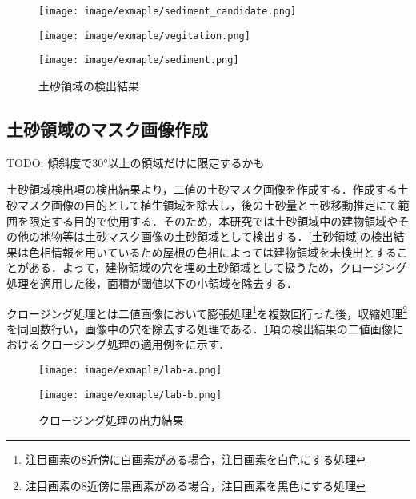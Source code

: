     \begin{figure}[t]
      \begin{minipage}[c]{0.3\hsize}
        \centering
        \texttt{[image: image/exmaple/sediment\_candidate.png]}
      \end{minipage}
      \begin{minipage}[c]{0.3\hsize}
        \centering
        \texttt{[image: image/exmaple/vegitation.png]}
      \end{minipage}
      \begin{minipage}[c]{0.3\hsize}
        \centering
        \texttt{[image: image/exmaple/sediment.png]}
      \end{minipage}
      \caption{土砂領域の検出結果}
      \label{土砂領域検出}
    \end{figure}

    \subsection{土砂領域のマスク画像作成}
    TODO: 傾斜度で30°以上の領域だけに限定するかも

      {土砂領域検出}項の検出結果より，二値の土砂マスク画像を作成する．作成する土砂マスク画像の目的として植生領域を除去し，後の土砂量と土砂移動推定にて範囲を限定する目的で使用する．そのため，本研究では土砂領域中の建物領域やその他の地物等は土砂マスク画像の土砂領域として検出する．\ref{土砂領域}の検出結果は色相情報を用いているため屋根の色相によっては建物領域を未検出とすることがある．よって，建物領域の穴を埋め土砂領域として扱うため，クロージング処理\cite{クロージング処理}を適用した後，面積が閾値以下の小領域を除去する．
      
      クロージング処理とは二値画像において膨張処理\footnote{注目画素の8近傍に白画素がある場合，注目画素を白色にする処理}を複数回行った後，収縮処理\footnote{注目画素の8近傍に黒画素がある場合，注目画素を黒色にする処理}を同回数行い，画像中の穴を除去する処理である．\ref{土砂領域検出}項の検出結果の二値画像におけるクロージング処理の適用例をに示す．

      \begin{figure}[t]
        \begin{minipage}[c]{0.45\hsize}
          \centering
          \texttt{[image: image/exmaple/lab-a.png]}
        \end{minipage}
        \begin{minipage}[c]{0.45\hsize}
          \centering
          \texttt{[image: image/exmaple/lab-b.png]}
        \end{minipage}
        \caption{クロージング処理の出力結果}
        \label{クロージング処理}
      \end{figure}

